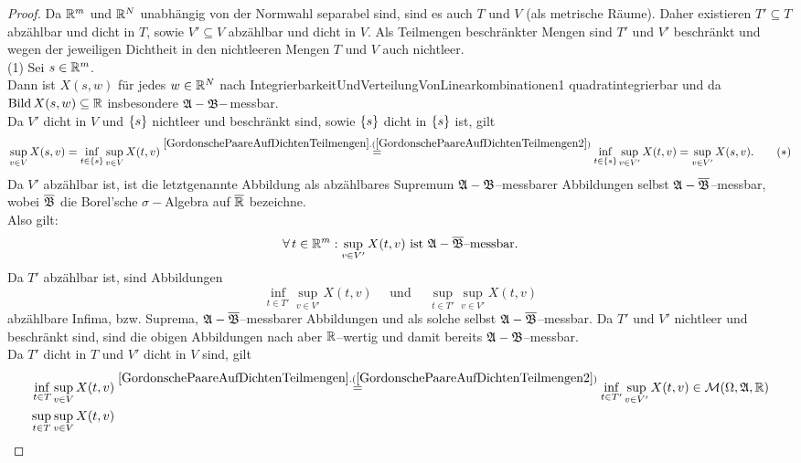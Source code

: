 \begin{proof}
Da $\mathbb{R}^m$ und $\mathbb{R}^N$ unabhängig von der Normwahl separabel sind, sind es auch
$T$ und $V$ (als metrische Räume).
Daher existieren $T' \subseteq T$ abzählbar und dicht in $T$, sowie
$V'\subseteq V$ abzählbar und dicht in $V$.
Als Teilmengen beschränkter Mengen sind $T'$ und $V'$ beschränkt und wegen der
jeweiligen Dichtheit in den nichtleeren Mengen $T$ und $V$ auch nichtleer.\\
(1)
Sei $s \in \mathbb{R}^m$.\\
Dann ist $X(s, w)$ für jedes $w \in \mathbb{R}^N$ nach 
{IntegrierbarkeitUndVerteilungVonLinearkombinationen1} quadratintegrierbar
und da $\mathop{\textrm{Bild}}\nolimits X(s, w) \subseteq \mathbb{R}$ insbesondere $\mathfrak{A}-\mathfrak{B}-$messbar.\\
Da $V'$ dicht in $V$ und $\left\{s\right\}$ nichtleer und beschränkt sind, sowie 
$\left\{s\right\}$ dicht in $\left\{s\right\}$ ist, gilt
\begin{align*}
 \sup_{v \in V}X(s, v) = \inf_{t \in \meng s}\sup_{v \in V}X(t, v)
\overset{\refclaim{GordonschePaareAufDichtenTeilmengen}
{GordonschePaareAufDichtenTeilmengen2}}= 
 \inf_{t \in \meng s}\sup_{v \in V'}X(t, v)
= \sup_{v \in V'}X(s, v)\text. \tag {$\ast$}
\end{align*}
Da $V'$ abzählbar ist, ist die letztgenannte Abbildung als abzählbares Supremum
$\mathfrak{A}-\mathfrak{B}$--messbarer Abbildungen selbst $\mathfrak{A}-\overline{\mathfrak{B}}$--messbar, wobei
$\overline {\mathfrak{B}}$ die Borel'sche $\sigma-$Algebra auf $\overline{\mathbb{R}}$ bezeichne.\\
Also gilt:
\[\forall\, t \in \mathbb{R}^m: \sup_{v \in V'}X(t, v) \text{ ist } \mathfrak{A}-\overline{\mathfrak{B}}
\text{--messbar.}\]
Da $T'$ abzählbar ist, sind Abbildungen \[
\inf_{t \in T'}\sup_{v \in V'}X(t,v)
 \quad \text{ und }\quad
\sup_{t \in T'}\sup_{v \in V'}X(t,v) \]
abzählbare Infima, bzw. Suprema, 
$\mathfrak{A}-\overline{\mathfrak{B}}$--messbarer Abbildungen und als solche selbst
$\mathfrak{A}-\overline{\mathfrak{B}}$--messbar. Da $T'$ und $V'$ nichtleer und beschränkt sind,
sind die obigen Abbildungen nach
aber $\mathbb{R}$--wertig und damit bereits $\mathfrak{A}-\mathfrak{B}$--messbar.\\
Da $T'$ dicht in $T$ und $V'$ dicht in $V$ sind, gilt
\begin{align*}
\inf_{t \in T}\sup_{v \in V}X(t, v) 
&\overset{\refclaim{GordonschePaareAufDichtenTeilmengen}
{GordonschePaareAufDichtenTeilmengen2}}= 
\inf_{t \in T'} \sup_{v \in V'}X(t,v) \in \mcm(\Omega, \mfa, \R)\\
\sup_{t \in T}\sup_{v \in V}X(t, v) 

\end{align*}
\end{proof}

